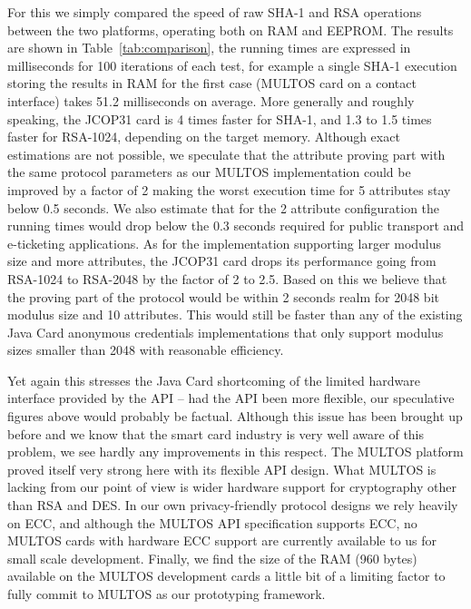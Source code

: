 For this we simply compared the speed of raw SHA-1 and RSA operations
between the two platforms, operating both on RAM and EEPROM.  The
results are shown in Table~\ref{tab:comparison}, the running times are
expressed in milliseconds for 100 iterations of each test, for example
a single SHA-1 execution storing the results in RAM for the first case (MULTOS
card on a contact interface) takes 51.2 milliseconds on average.
More generally and roughly speaking,
the JCOP31 card is 4 times faster for SHA-1, and 1.3 to 1.5 times
faster for RSA-1024, depending on the target memory.
Although exact estimations are not possible, we
speculate that the attribute proving part with the same protocol
parameters as our MULTOS implementation could be improved by a factor
of 2 making the worst execution time for 5 attributes stay below 0.5 seconds.
We also estimate that for the 2 attribute configuration the running times
would drop below the 0.3 seconds required for public transport and e-ticketing applications.
As for the implementation supporting
larger modulus size and more attributes, the JCOP31 card drops
its performance going from RSA-1024 to RSA-2048 by the factor of 2 to 2.5.
Based on this we believe that the
proving part of the protocol would be within 2 seconds realm for 2048
bit modulus size and 10 attributes. This would still be faster
than any of the existing Java Card anonymous credentials
implementations that only support modulus sizes smaller than 2048
with reasonable efficiency.

Yet again this stresses the Java Card shortcoming of the limited
hardware interface provided by the API -- had the API been more
flexible, our speculative figures above would probably be factual.
Although this issue has been brought up before and we know
that the smart card industry is very well aware of this problem, we
see hardly any improvements in this respect. The MULTOS platform
proved itself very strong here with its flexible API design. What
MULTOS is lacking from our point of view is wider hardware support for
cryptography other than RSA and DES. In our own privacy-friendly protocol
designs we rely heavily on ECC, and although the MULTOS API
specification supports ECC, no MULTOS cards with hardware ECC support are
currently available to us for small scale development.
Finally, we find the size of the RAM
(960 bytes) available on the MULTOS development cards a little bit of
a limiting factor to fully commit to MULTOS as our prototyping
framework.